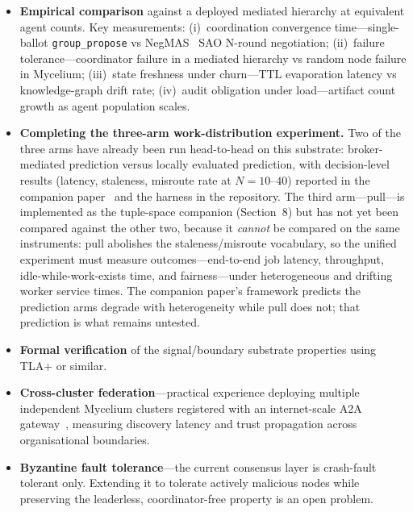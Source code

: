 \documentclass[11pt]{article}
\begin{document}
\begin{itemize}
\item \textbf{Empirical comparison} against a deployed mediated hierarchy at
  equivalent agent counts. Key measurements: (i)~coordination convergence
  time---single-ballot \texttt{group\_propose} vs NegMAS~\cite{negmas} SAO
  N-round negotiation; (ii)~failure tolerance---coordinator failure in a mediated
  hierarchy vs random node failure in Mycelium; (iii)~state freshness under
  churn---TTL evaporation latency vs knowledge-graph drift rate; (iv)~audit
  obligation under load---artifact count growth as agent population scales.

\item \textbf{Completing the three-arm work-distribution experiment.} Two of
  the three arms have already been run head-to-head on this substrate:
  broker-mediated prediction versus locally evaluated prediction, with
  decision-level results (latency, staleness, misroute rate at
  $N=10$--$40$) reported in the companion paper~\cite{companion} and the harness in the
  repository. The third arm---pull---is implemented as the tuple-space
  companion (Section~8) but has not yet been compared against the other two,
  because it \emph{cannot} be compared on the same instruments: pull abolishes
  the staleness/misroute vocabulary, so the unified experiment must measure
  outcomes---end-to-end job latency, throughput, idle-while-work-exists time,
  and fairness---under heterogeneous and drifting worker service times. The
  companion paper's framework predicts the prediction arms degrade with
  heterogeneity while pull does not; that prediction is what remains untested.

\item \textbf{Formal verification} of the signal/boundary substrate properties
  using TLA+ or similar.

\item \textbf{Cross-cluster federation}---practical experience deploying multiple
  independent Mycelium clusters registered with an internet-scale A2A
  gateway~\cite{nanda}, measuring discovery latency and trust propagation across
  organisational boundaries.

\item \textbf{Byzantine fault tolerance}---the current consensus layer is
  crash-fault tolerant only. Extending it to tolerate actively malicious nodes
  while preserving the leaderless, coordinator-free property is an open problem.


\end{itemize}
\end{document}

